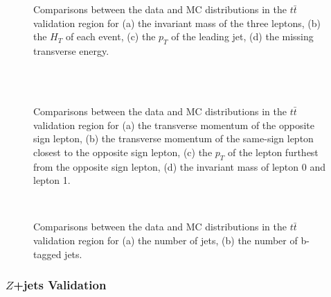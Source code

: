 \begin{figure}[H]
    \\
    \\
    \caption{Comparisons between the data and MC distributions in the $t\bar{t}$ validation region for (a) the invariant mass of the three leptons, (b) the $H_T$ of each event, (c) the $p_T$ of the leading jet, (d) the missing transverse energy.}    
    \end{figure}
\begin{figure}[H]
    \\
    \\
    \caption{Comparisons between the data and MC distributions in the $t\bar{t}$ validation region for (a) the transverse momentum of the opposite sign lepton, (b) the transverse momentum of the same-sign lepton closest to the opposite sign lepton, (c) the $p_T$ of the lepton furthest from the opposite sign lepton, (d) the invariant mass of lepton 0 and lepton 1.}
\end{figure}
\begin{figure}[H]
    \\
    \caption{Comparisons between the data and MC distributions in the $t\bar{t}$ validation region for (a) the number of jets, (b) the number of b-tagged jets.}
    \label{ttbar_kinematics}
\end{figure}

\subsubsection{$Z$+jets Validation}

